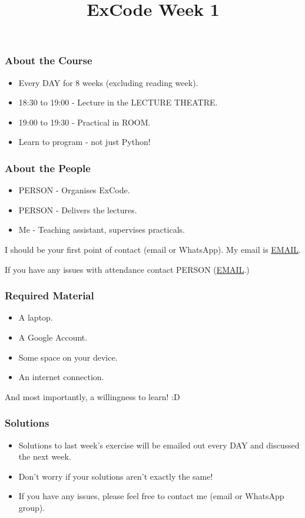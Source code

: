 \documentclass{beamer}
\title{ExCode Week 1}
\institute{University of Exeter}
\date{\displaydate{today}}
\begin{document}
\frame{\titlepage}

\begin{frame}
	\frametitle{About the Course}

	\begin{itemize}
		\item{Every DAY for 8 weeks (excluding reading
			week).}
		\item{18:30 to 19:00 - Lecture in the LECTURE THEATRE.}
		\item{19:00 to 19:30 - Practical in ROOM.}
		\item{Learn to program - not just Python!}
	\end{itemize}
\end{frame}

\begin{frame}
	\frametitle{About the People}

	\begin{itemize}
		\item{PERSON - Organises ExCode.}
		\item{PERSON - Delivers the lectures.}
		\item{Me - Teaching assistant, supervises practicals.}
	\end{itemize}

	I should be your first point of contact (email or WhatsApp). My email
	is \url{EMAIL}.

	If you have any issues with attendance contact PERSON
	(\url{EMAIL}.)
\end{frame}

\begin{frame}
	\frametitle{Required Material}

	\begin{itemize}
		\item{A laptop.}
		\item{A Google Account.}
		\item{Some space on your device.}
		\item{An internet connection.}
	\end{itemize}

	And most importantly, a willingness to learn! :D
\end{frame}

\begin{frame}
	\frametitle{Solutions}

	\begin{itemize}
		\item{Solutions to last week's exercise will be
			emailed out every DAY and discussed the next
			week.}
		\item{Don't worry if your solutions aren't exactly
			the same!}
		\item{If you have any issues, please feel free to contact
			me (email or WhatsApp group).}
	\end{itemize}
\end{frame}
\end{document}

